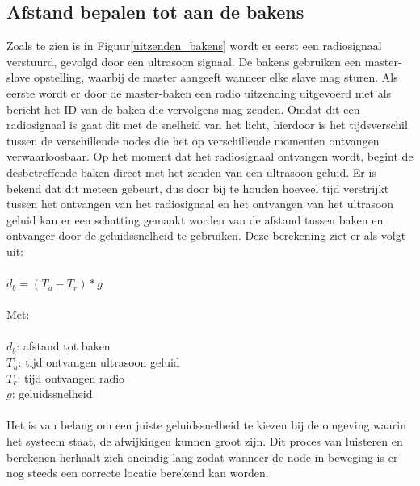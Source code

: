 \documentclass{article}
\begin{document}
\subsection{Afstand bepalen tot aan de bakens}
Zoals te zien is in Figuur\ref{uitzenden_bakens} wordt er eerst een radiosignaal verstuurd, gevolgd door een ultrasoon signaal. De bakens gebruiken een master-slave opstelling, waarbij de master aangeeft wanneer elke slave mag sturen. Als eerste wordt er door de master-baken een radio uitzending uitgevoerd met als bericht het ID van de baken die vervolgens mag zenden. Omdat dit een radiosignaal is gaat dit met de snelheid van het licht, hierdoor is het tijdsverschil tussen de verschillende nodes die het op verschillende momenten ontvangen verwaarloosbaar. Op het moment dat het radiosignaal ontvangen wordt, begint de desbetreffende baken direct met het zenden van een ultrasoon geluid. Er is bekend dat dit meteen gebeurt, dus door bij te houden hoeveel tijd verstrijkt tussen het ontvangen van het radiosignaal en het ontvangen van het ultrasoon geluid kan er een schatting gemaakt worden van de afstand tussen baken en ontvanger door de geluidssnelheid te gebruiken. Deze berekening ziet er als volgt uit:\\
\\
	\indent$ d_b = (T_u- T_r) * g $\\
	\\
	Met:\\
	\\
	\indent$ d_b$: afstand tot baken\\
	\indent$T_u$: tijd ontvangen ultrasoon geluid\\
	\indent$T_r$: tijd ontvangen radio\\
	\indent$g$: geluidssnelheid\\
\\
Het is van belang om een juiste geluidssnelheid te kiezen bij de omgeving waarin het systeem staat, de afwijkingen kunnen groot zijn. Dit proces van luisteren en berekenen herhaalt zich oneindig lang zodat wanneer de node in beweging is er nog steeds een correcte locatie berekend kan worden. 
	
\end{document}
